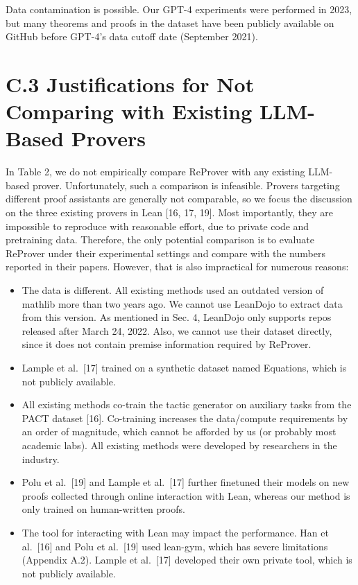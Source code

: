 \documentclass[
]{article}
\providecommand{\tightlist}{%
  \setlength{\itemsep}{0pt}\setlength{\parskip}{0pt}}
\begin{document}
Data contamination is possible. Our GPT-4 experiments were performed in
2023, but many theorems and proofs in the dataset have been publicly
available on GitHub before GPT-4's data cutoff date (September 2021).

\section{C.3 Justifications for Not Comparing with Existing LLM-Based
Provers}\label{c.3-justifications-for-not-comparing-with-existing-llm-based-provers}

In Table 2, we do not empirically compare ReProver with any existing
LLM-based prover. Unfortunately, such a comparison is infeasible.
Provers targeting different proof assistants are generally not
comparable, so we focus the discussion on the three existing provers in
Lean {[}16, 17, 19{]}. Most importantly, they are impossible to
reproduce with reasonable effort, due to private code and pretraining
data. Therefore, the only potential comparison is to evaluate ReProver
under their experimental settings and compare with the numbers reported
in their papers. However, that is also impractical for numerous reasons:

\begin{itemize}
\tightlist
\item
  The data is different. All existing methods used an outdated version
  of mathlib more than two years ago. We cannot use LeanDojo to extract
  data from this version. As mentioned in Sec. 4, LeanDojo only supports
  repos released after March 24, 2022. Also, we cannot use their dataset
  directly, since it does not contain premise information required by
  ReProver.\\
\item
  Lample et al.~{[}17{]} trained on a synthetic dataset named Equations,
  which is not publicly available.\\
\item
  All existing methods co-train the tactic generator on auxiliary tasks
  from the PACT dataset {[}16{]}. Co-training increases the data/compute
  requirements by an order of magnitude, which cannot be afforded by us
  (or probably most academic labs). All existing methods were developed
  by researchers in the industry.\\
\item
  Polu et al.~{[}19{]} and Lample et al.~{[}17{]} further finetuned
  their models on new proofs collected through online interaction with
  Lean, whereas our method is only trained on human-written proofs.\\
\item
  The tool for interacting with Lean may impact the performance. Han et
  al.~{[}16{]} and Polu et al.~{[}19{]} used lean-gym, which has severe
  limitations (Appendix A.2). Lample et al.~{[}17{]} developed their own
  private tool, which is not publicly available.
\end{itemize}
\end{document}
